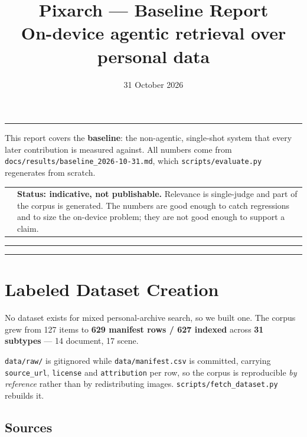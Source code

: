 \documentclass[11pt,a4paper]{article}
\title{\vspace{-1.4cm}\textbf{Pixarch --- Baseline Report}\\[0.35em]
       \large On-device agentic retrieval over personal data}
\author{}
\date{31 October 2026}
\makeatletter
\newenvironment{caveat}
  {\par\vspace{0.6em}\noindent
   \begin{tabular}{@{}p{0.4em}@{\hspace{0.8em}}p{\dimexpr\linewidth-2.2em\relax}@{}}
   \cellcolor{linknavy}\rule{0pt}{1em} &}
  {\end{tabular}\par\vspace{0.6em}}
\newcommand{\code}[1]{\texttt{\small #1}}
\makeatother
\begin{document}
\maketitle
\vspace{-0.9cm}

\noindent\rule{\linewidth}{0.4pt}
\vspace{0.4em}

\noindent
This report covers the \textbf{baseline}: the non-agentic, single-shot system
that every later contribution is measured against. All numbers come from
\code{docs/results/baseline\_2026-10-31.md}, which \code{scripts/evaluate.py}
regenerates from scratch.

\begin{caveat}
\textbf{Status: indicative, not publishable.} Relevance is single-judge and part
of the corpus is generated. The numbers are good enough to catch regressions and
to size the on-device problem; they are not good enough to support a claim.
\end{caveat}

\noindent\rule{\linewidth}{0.4pt}

\tableofcontents
\vspace{0.6em}
\noindent\rule{\linewidth}{0.4pt}

\section{Labeled Dataset Creation}

No dataset exists for mixed personal-archive search, so we built one. The corpus
grew from 127 items to \textbf{629 manifest rows / 627 indexed} across
\textbf{31 subtypes} --- 14 document, 17 scene.

\code{data/raw/} is gitignored while \code{data/manifest.csv} is committed,
carrying \code{source\_url}, \code{license} and \code{attribution} per row, so the
corpus is reproducible \emph{by reference} rather than by redistributing images.
\code{scripts/fetch\_dataset.py} rebuilds it.

\subsection{Sources}
\end{document}
